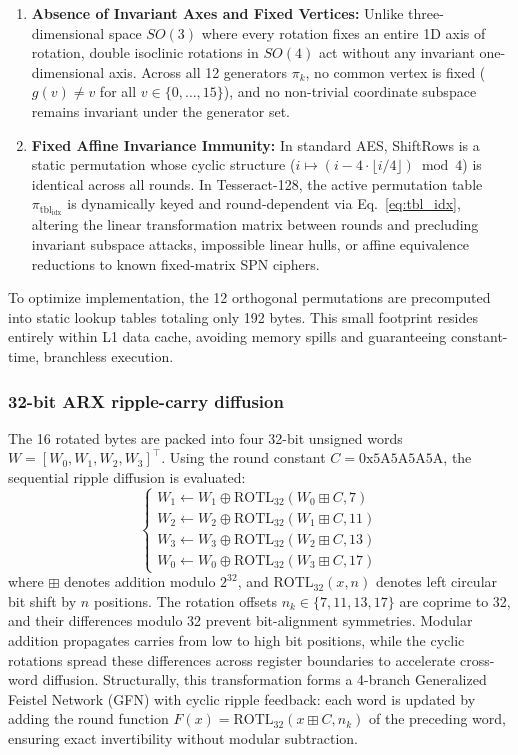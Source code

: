 \documentclass[review,12pt]{elsarticle}
\begin{document}
\begin{enumerate}
    \item \textbf{Absence of Invariant Axes and Fixed Vertices:} Unlike three-dimensional space $SO(3)$ where every rotation fixes an entire 1D axis of rotation, double isoclinic rotations in $SO(4)$ act without any invariant one-dimensional axis. Across all 12 generators $\pi_k$, no common vertex is fixed ($g(v) \neq v$ for all $v \in \{0, \dots, 15\}$), and no non-trivial coordinate subspace remains invariant under the generator set.
    \item \textbf{Fixed Affine Invariance Immunity:} In standard AES, ShiftRows is a static permutation whose cyclic structure ($i \mapsto (i - 4 \cdot \lfloor i/4 \rfloor) \bmod 4$) is identical across all rounds. In Tesseract-128, the active permutation table $\pi_{\text{tbl}_{\text{idx}}}$ is dynamically keyed and round-dependent via Eq.~\eqref{eq:tbl_idx}, altering the linear transformation matrix between rounds and precluding invariant subspace attacks, impossible linear hulls, or affine equivalence reductions to known fixed-matrix SPN ciphers.
\end{enumerate}
To optimize implementation, the 12 orthogonal permutations are precomputed into static lookup tables totaling only 192 bytes. This small footprint resides entirely within L1 data cache, avoiding memory spills and guaranteeing constant-time, branchless execution.

\subsubsection{32-bit ARX ripple-carry diffusion}
The 16 rotated bytes are packed into four 32-bit unsigned words $W = [W_0, W_1, W_2, W_3]^\top$. Using the round constant $C = \text{0x5A5A5A5A}$, the sequential ripple diffusion is evaluated:
\begin{equation}
\begin{cases}
    W_1 \leftarrow W_1 \oplus \text{ROTL}_{32}(W_0 \boxplus C, 7) \\
    W_2 \leftarrow W_2 \oplus \text{ROTL}_{32}(W_1 \boxplus C, 11) \\
    W_3 \leftarrow W_3 \oplus \text{ROTL}_{32}(W_2 \boxplus C, 13) \\
    W_0 \leftarrow W_0 \oplus \text{ROTL}_{32}(W_3 \boxplus C, 17)
\end{cases}
\end{equation}
where $\boxplus$ denotes addition modulo $2^{32}$, and $\text{ROTL}_{32}(x, n)$ denotes left circular bit shift by $n$ positions. The rotation offsets $n_k \in \{7, 11, 13, 17\}$ are coprime to 32, and their differences modulo 32 prevent bit-alignment symmetries. Modular addition propagates carries from low to high bit positions, while the cyclic rotations spread these differences across register boundaries to accelerate cross-word diffusion. Structurally, this transformation forms a 4-branch Generalized Feistel Network (GFN) with cyclic ripple feedback: each word is updated by adding the round function $F(x) = \text{ROTL}_{32}(x \boxplus C, n_k)$ of the preceding word, ensuring exact invertibility without modular subtraction.
\end{document}
